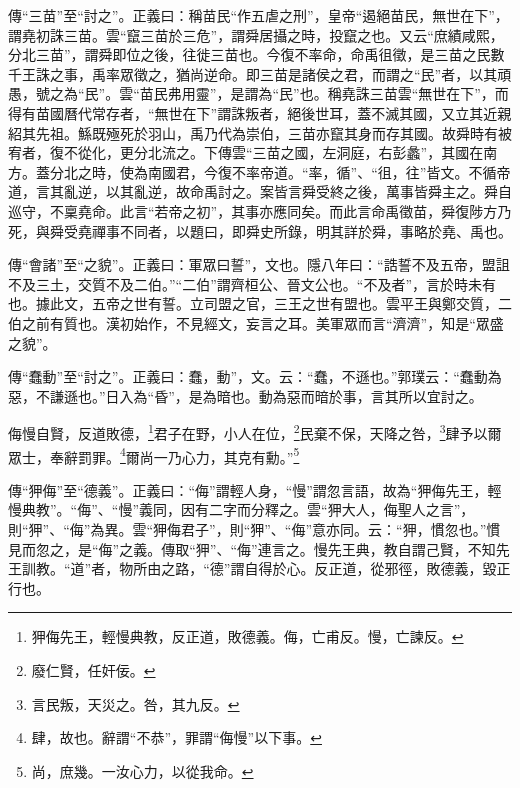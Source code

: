 {\noindent\zhuan{}\fzbyks 傳“三苗”至“討之”。正義曰：稱苗民“作五虐之刑”，皇帝“遏絕苗民，無世在下”，謂堯初誅三苗。雲“竄三苗於三危”，謂舜居攝之時，投竄之也。又云“庶績咸熙，分北三苗”，謂舜即位之後，往徙三苗也。今復不率命，命禹徂徵，是三苗之民數千王誅之事，禹率眾徵之，猶尚逆命。即三苗是諸侯之君，而謂之“民”者，以其頑愚，號之為“民”。雲“苗民弗用靈”，是謂為“民”也。稱堯誅三苗雲“無世在下”，而得有苗國曆代常存者，“無世在下”謂誅叛者，絕後世耳，蓋不滅其國，又立其近親紹其先祖。鯀既殛死於羽山，禹乃代為崇伯，三苗亦竄其身而存其國。故舜時有被宥者，復不從化，更分北流之。下傳雲“三苗之國，左洞庭，右彭蠡”，其國在南方。蓋分北之時，使為南國君，今復不率帝道。“率，循”、“徂，往”皆文。不循帝道，言其亂逆，以其亂逆，故命禹討之。案皆言舜受終之後，萬事皆舜主之。舜自巡守，不稟堯命。此言“若帝之初”，其事亦應同矣。而此言命禹徵苗，舜復陟方乃死，與舜受堯禪事不同者，以題曰，即舜史所錄，明其詳於舜，事略於堯、禹也。 \par}

{\noindent\zhuan{}\fzbyks 傳“會諸”至“之貌”。正義曰：軍眾曰誓”，文也。隱八年曰：“誥誓不及五帝，盟詛不及三土，交質不及二伯。”“二伯”謂齊桓公、晉文公也。“不及者”，言於時未有也。據此文，五帝之世有誓。立司盟之官，三王之世有盟也。雲平王與鄭交質，二伯之前有質也。漢初始作，不見經文，妄言之耳。美軍眾而言“濟濟”，知是“眾盛之貌”。 \par}

{\noindent\zhuan{}\fzbyks 傳“蠢動”至“討之”。正義曰：蠢，動”，文。云：“蠢，不遜也。”郭璞云：“蠢動為惡，不謙遜也。”日入為“昏”，是為暗也。動為惡而暗於事，言其所以宜討之。 \par}

侮慢自賢，反道敗德，\footnote{狎侮先王，輕慢典教，反正道，敗德義。侮，亡甫反。慢，亡諫反。}君子在野，小人在位，\footnote{廢仁賢，任奸佞。}民棄不保，天降之咎，\footnote{言民叛，天災之。咎，其九反。}肆予以爾眾士，奉辭罰罪。\footnote{肆，故也。辭謂“不恭”，罪謂“侮慢”以下事。}爾尚一乃心力，其克有勳。”\footnote{尚，庶幾。一汝心力，以從我命。}

{\noindent\zhuan{}\fzbyks 傳“狎侮”至“德義”。正義曰：“侮”謂輕人身，“慢”謂忽言語，故為“狎侮先王，輕慢典教”。“侮”、“慢”義同，因有二字而分釋之。雲“狎大人，侮聖人之言”，則“狎”、“侮”為異。雲“狎侮君子”，則“狎”、“侮”意亦同。云：“狎，慣忽也。”慣見而忽之，是“侮”之義。傳取“狎”、“侮”連言之。慢先王典，教自謂己賢，不知先王訓教。“道”者，物所由之路，“德”謂自得於心。反正道，從邪徑，敗德義，毀正行也。 \par}

